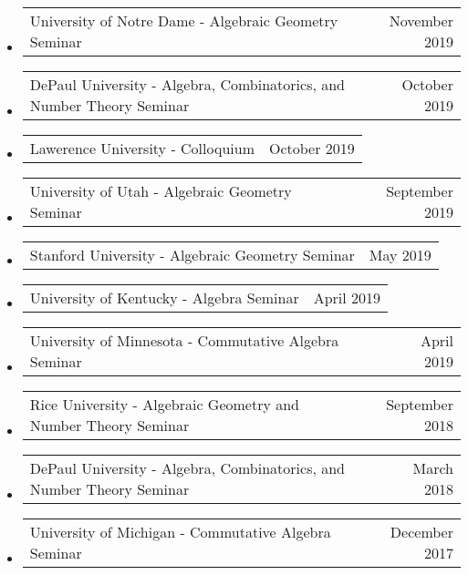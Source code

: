 \documentclass[letterpaper,11pt]{article}
\makeatletter
\newcommand{\ressubheading}[4]{
\begin{tabular*}{6.5in}[t]{l@{\cftdotfill{\cftsecdotsep}\extracolsep{\fill}}r}
		\textbf{#1} & #2 \\
		\textit{#3} & \textit{#4} \\
\end{tabular*}\vspace{-6pt}}
\newcommand{\ressubheadingTalk}[2]{
\begin{tabular*}{6.5in}[t]{l@{\cftdotfill{\cftsecdotsep}\extracolsep{\fill}}r}
		#1 & #2 \\
\end{tabular*}\vspace{-6pt}}
\makeatother
\begin{document}
\begin{itemize}
\item
	\ressubheadingTalk{University of Notre Dame - Algebraic Geometry Seminar}{November 2019}

\item
	\ressubheadingTalk{DePaul University - Algebra, Combinatorics, and Number Theory Seminar}{October 2019}{}{}
	
\item
	\ressubheadingTalk{Lawerence University - Colloquium}{October 2019}{}{}

\item
	\ressubheadingTalk{University of Utah - Algebraic Geometry Seminar}{September 2019}

\item
	\ressubheadingTalk{Stanford University - Algebraic Geometry Seminar}{May 2019}
	
\item
	\ressubheadingTalk{University of Kentucky - Algebra Seminar}{April 2019}
		
\item
	\ressubheadingTalk{University of Minnesota - Commutative Algebra Seminar}{April 2019}
	
	
\item
	\ressubheadingTalk{Rice University - Algebraic Geometry and Number Theory Seminar}{September 2018}{}{}
		
\item
	\ressubheadingTalk{DePaul University - Algebra, Combinatorics, and Number Theory Seminar}{March 2018}{}{}
	

\item
	\ressubheadingTalk{University of Michigan - Commutative Algebra Seminar}{December 2017}{}{}

%
%
\end{itemize}
\vspace{-.25in}
\end{document}
